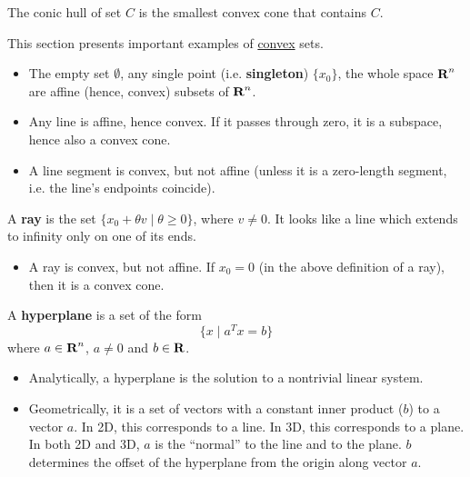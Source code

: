\begin{Fact}
  The conic hull of set $C$ is the smallest convex cone that contains $C$. 
\end{Fact}


This section presents important examples of \underline{convex} sets.


\begin{itemize}
\item The empty set $\emptyset$, any single point (i.e. \textbf{singleton})
  $\{x_0\}$, the whole space $\textbf{R}^n$ are affine (hence, convex) subsets of
  $\textbf{R}^n$.
\item Any line is affine, hence convex. If it passes through zero, it is a
  subspace, hence also a convex cone.
\item A line segment is convex, but not affine (unless it is a zero-length
  segment, i.e. the line's endpoints coincide).
\end{itemize}

\begin{Definition}
  A \textbf{ray} is the set $\{x_0+\theta v \mid \theta\ge 0\}$, where $v\ne
  0$. It looks like a line which extends to infinity only on one of its ends.
\end{Definition}

\begin{itemize}
\item A ray is convex, but not affine. If $x_0=0$ (in the above definition of a
  ray), then it is a convex cone.
\end{itemize}


\begin{Definition}
  A \textbf{hyperplane} is a set of the form
  \begin{equation*}
    \{ x \mid a^Tx=b \}
  \end{equation*}
  where $a\in\textbf{R}^n$, $a\ne 0$ and $b\in\textbf{R}$.

  \begin{itemize}
  \item Analytically, a hyperplane is the solution to a nontrivial linear
    system.
  \item Geometrically, it is a set of vectors with a constant inner product
    ($b$) to a vector $a$. In 2D, this corresponds to a line. In 3D, this
    corresponds to a plane. In both 2D and 3D, $a$ is the ``normal'' to the line
    and to the plane. $b$ determines the offset of the hyperplane from the
    origin along vector $a$.
  \end{itemize}
\end{Definition}

